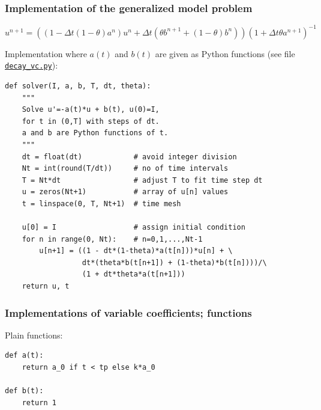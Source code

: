 \documentclass{beamer}
\begin{document}
\begin{frame}
\frametitle{Implementation of the generalized model problem}

\label{decay:general}

\begin{equation}
u^{n+1} = ((1 - \Delta t(1-\theta)a^n)u^n
+ \Delta t(\theta b^{n+1} + (1-\theta)b^n))(1 + \Delta t\theta a^{n+1})^{-1}
\end{equation}

Implementation where $a(t)$ and $b(t)$ are given as
Python functions (see file \href{{http://tinyurl.com/ofkw6kc/genz/decay_vc.py}}{\nolinkurl{decay_vc.py}}):

\begin{verbatim}
def solver(I, a, b, T, dt, theta):
    """
    Solve u'=-a(t)*u + b(t), u(0)=I,
    for t in (0,T] with steps of dt.
    a and b are Python functions of t.
    """
    dt = float(dt)            # avoid integer division
    Nt = int(round(T/dt))     # no of time intervals
    T = Nt*dt                 # adjust T to fit time step dt
    u = zeros(Nt+1)           # array of u[n] values
    t = linspace(0, T, Nt+1)  # time mesh

    u[0] = I                  # assign initial condition
    for n in range(0, Nt):    # n=0,1,...,Nt-1
        u[n+1] = ((1 - dt*(1-theta)*a(t[n]))*u[n] + \ 
                  dt*(theta*b(t[n+1]) + (1-theta)*b(t[n])))/\ 
                  (1 + dt*theta*a(t[n+1]))
    return u, t
\end{verbatim}
\end{frame}

\begin{frame}
\frametitle{Implementations of variable coefficients; functions}

Plain functions:

\begin{verbatim}
def a(t):
    return a_0 if t < tp else k*a_0

def b(t):
    return 1
\end{verbatim}
\end{frame}
\end{document}
